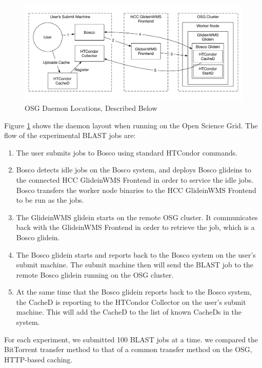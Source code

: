 \begin{figure}[ht]
	\centering
	\includegraphics[width=\textwidth]{images/OSGDaemonLayout.pdf}
	\caption{OSG Daemon Locations, Described Below}
	\label{fig:osgdaemonlayoutcached}
\end{figure}

Figure \ref{fig:osgdaemonlayoutcached} shows the daemon layout when running on the Open Science Grid.  The flow of the experimental BLAST jobs are:

\begin{enumerate}
	\item The user submits jobs to Bosco using standard HTCondor commands.
	
	\item Bosco detects idle jobs on the Bosco system, and deploys Bosco glideins to the connected HCC GlideinWMS Frontend in order to service the idle jobs.  Bosco transfers the worker node binaries to the HCC GlideinWMS Frontend to be run as the jobs.
	
	\item The GlideinWMS glidein starts on the remote OSG cluster.  It communicates back with the GlideinWMS Frontend in order to retrieve the job, which is a Bosco glidein.
	
	\item The Bosco glidein starts and reports back to the Bosco system on the user's submit machine.  The submit machine then will send the BLAST job to the remote Bosco glidein running on the OSG cluster.
	
	\item At the same time that the Bosco glidein reports back to the Bosco system, the CacheD is reporting to the HTCondor Collector on the user's submit machine.  This will add the CacheD to the list of known CacheDs in the system.
\end{enumerate}

For each experiment, we submitted 100 BLAST jobs at a time.  we compared the BitTorrent transfer method to that of a common transfer method on the OSG, HTTP-based caching. 

